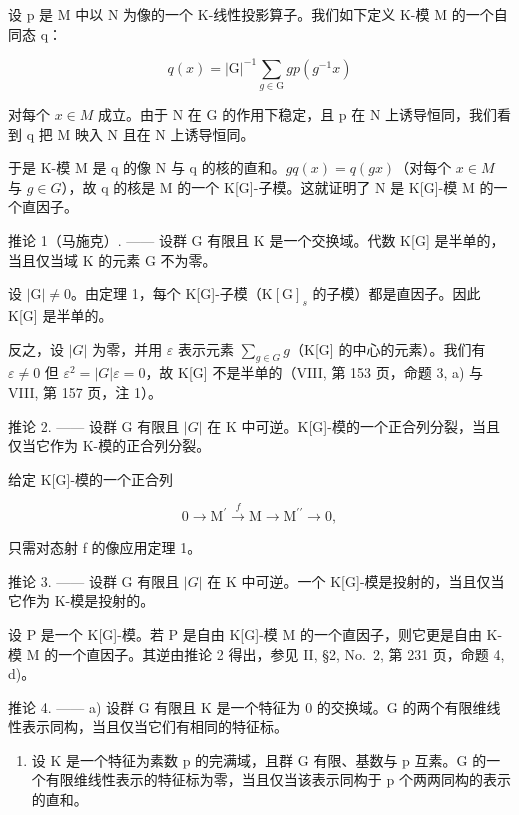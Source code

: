 设 p 是 M 中以 N 为像的一个 K-线性投影算子。我们如下定义 K-模 M 的一个自同态 q：

\[
q (x) = | \mathrm{G} | ^ {- 1} \sum_ {g \in \mathrm{G}} g p (g ^ {- 1} x)
\]

对每个 \(x \in M\) 成立。由于 N 在 G 的作用下稳定，且 p 在 N 上诱导恒同，我们看到 q 把 M 映入 N 且在 N 上诱导恒同。

于是 K-模 M 是 q 的像 N 与 q 的核的直和。\(g q(x) = q(gx)\)（对每个 \(x \in M\) 与 \(g \in G\)），故 q 的核是 M 的一个 K{[}G{]}-子模。这就证明了 N 是 K{[}G{]}-模 M 的一个直因子。

推论 1（马施克）. —— 设群 G 有限且 K 是一个交换域。代数 K{[}G{]} 是半单的，当且仅当域 K 的元素 \textbar G\textbar{} 不为零。

设 \(|\mathrm{G}| \neq 0\)。由定理 1，每个 K{[}G{]}-子模（\(\mathrm{K}[\mathrm{G}]_s\) 的子模）都是直因子。因此 K{[}G{]} 是半单的。

反之，设 \(|G|\) 为零，并用 \(\varepsilon\) 表示元素 \(\sum_{g\in G} g\)（K{[}G{]} 的中心的元素）。我们有 \(\varepsilon \neq 0\) 但 \(\varepsilon^{2} = |G|\varepsilon = 0\)，故 K{[}G{]} 不是半单的（VIII, 第 153 页，命题 3, a) 与 VIII, 第 157 页，注 1）。

推论 2. —— 设群 G 有限且 \(|G|\) 在 K 中可逆。K{[}G{]}-模的一个正合列分裂，当且仅当它作为 K-模的正合列分裂。

给定 K{[}G{]}-模的一个正合列

\[
0 \longrightarrow \mathrm{M} ^ {\prime} \stackrel {f} {\longrightarrow} \mathrm{M} \longrightarrow \mathrm{M} ^ {\prime \prime} \longrightarrow 0,
\]

只需对态射 f 的像应用定理 1。

推论 3. —— 设群 G 有限且 \(|G|\) 在 K 中可逆。一个 K{[}G{]}-模是投射的，当且仅当它作为 K-模是投射的。

设 P 是一个 K{[}G{]}-模。若 P 是自由 K{[}G{]}-模 M 的一个直因子，则它更是自由 K-模 M 的一个直因子。其逆由推论 2 得出，参见 II, §2, No.~2, 第 231 页，命题 4, d)。

推论 4. —— a) 设群 G 有限且 K 是一个特征为 0 的交换域。G 的两个有限维线性表示同构，当且仅当它们有相同的特征标。

\begin{enumerate}
\def\labelenumi{\alph{enumi})}
\setcounter{enumi}{1}
\tightlist
\item
  设 K 是一个特征为素数 p 的完满域，且群 G 有限、基数与 p 互素。G 的一个有限维线性表示的特征标为零，当且仅当该表示同构于 p 个两两同构的表示的直和。
\end{enumerate}

